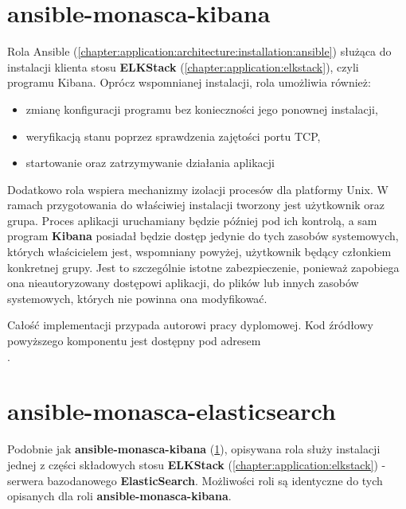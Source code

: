 \section{ansible-monasca-kibana}
\label{chapter:application:own_work:ansible_kibana}

    Rola Ansible (\ref{chapter:application:architecture:installation:ansible}) służąca do 
    instalacji klienta stosu \textbf{ELKStack} (\ref{chapter:application:elkstack}), czyli programu Kibana.
    Oprócz wspomnianej instalacji, rola umożliwia również:
    \begin{itemize}
        \item zmianę konfiguracji programu bez konieczności jego ponownej instalacji,
        \item weryfikacją stanu poprzez sprawdzenia zajętości portu TCP,
        \item startowanie oraz zatrzymywanie działania aplikacji
    \end{itemize}
    Dodatkowo rola wspiera mechanizmy izolacji procesów dla platformy Unix. W ramach przygotowania
    do właściwiej instalacji tworzony jest użytkownik oraz grupa. Proces aplikacji uruchamiany będzie później
    pod ich kontrolą, a sam program \textbf{Kibana} posiadał będzie dostęp jedynie do tych zasobów
    systemowych, których właścicielem jest, wspomniany powyżej, użytkownik będący członkiem konkretnej grupy.
    Jest to szczególnie istotne zabezpieczenie, ponieważ zapobiega ona nieautoryzowany dostępowi aplikacji,
    do plików lub innych zasobów systemowych, których nie powinna ona modyfikować.
    
    Całość implementacji przypada autorowi pracy dyplomowej. Kod źródłowy powyższego komponentu jest
    dostępny pod adresem \\ .

\section{ansible-monasca-elasticsearch}
\label{chapter:application:own_work:ansible_elasticsearch}

    Podobnie jak \textbf{ansible-monasca-kibana} (\ref{chapter:application:own_work:ansible_kibana}), opisywana
    rola służy instalacji jednej z części składowych stosu \textbf{ELKStack} (\ref{chapter:application:elkstack}) - 
    serwera bazodanowego \textbf{ElasticSearch}. Możliwości roli są identyczne do tych opisanych dla roli 
    \textbf{ansible-monasca-kibana}.
    
